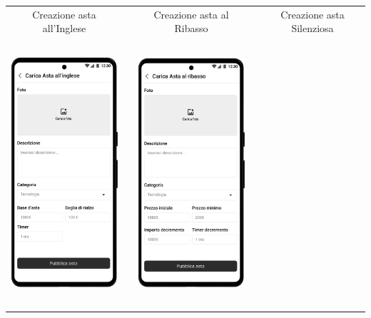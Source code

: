 \begin{center}
	\begin{tabular}{ccccc}
		Creazione asta all'Inglese                                                         &  &
		Creazione asta al Ribasso                                                          &  &
		Creazione asta Silenziosa                                                               \\
		\includegraphics[height=280pt]{assets/mockup/Carica Asta 1.1 Asta all'Inglese.png} &  &
		\includegraphics[height=280pt]{assets/mockup/Carica Asta 1.1 Asta al Ribasso.png}  &  &

\end{tabular}
\end{center}
